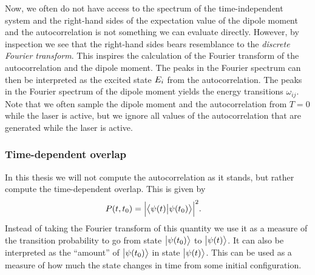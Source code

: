                 Now, we often do not have access to the spectrum of the
                time-independent system and the right-hand sides of the
                expectation value of the dipole moment and the autocorrelation
                is not something we can evaluate directly.
                However, by inspection we see that the right-hand sides bears
                resemblance to the \emph{discrete Fourier transform}.
                This inspires the calculation of the Fourier transform of the
                autocorrelation and the dipole moment.
                The peaks in the Fourier spectrum can then be interpreted as the
                excited state $E_i$ from the autocorrelation.
                The peaks in the Fourier spectrum of the dipole moment yields
                the energy transitions $\omega_{ij}$.
                Note that we often sample the dipole moment and the
                autocorrelation from $T = 0$ while the laser is active, but we
                ignore all values of the autocorrelation that are generated
                while the laser is active.

            \subsubsection{Time-dependent overlap}
                In this thesis we will not compute the autocorrelation as it
                stands, but rather compute the time-dependent overlap.
                This is given by
                \begin{align}
                    P(t, t_0)
                    &= \abs{\braket{\psi(t)}{\psi(t_0)}}^2.
                \end{align}
                Instead of taking the Fourier transform of this quantity we use
                it as a measure of the transition probability to go from state
                $\ket{\psi(t_0)}$ to $\ket{\psi(t)}$.
                It can also be interpreted as the ``amount'' of
                $\ket{\psi(t_0)}$ in state $\ket{\psi(t)}$.
                This can be used as a measure of how much the state changes in
                time from some initial configuration.


